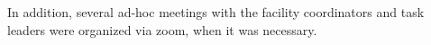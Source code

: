 In addition, several ad-hoc meetings with the facility coordinators and task leaders were organized via zoom, when it was necessary. 












